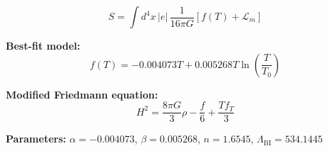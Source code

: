 
\begin{equation}
  S = \int d^4x \, |e| \, \frac{1}{16\pi G} \left[ f(T) + \mathcal{L}_m \right]
\end{equation}

\textbf{Best-fit model:}
\begin{equation}
  f(T) = -0.004073 T + 0.005268 T \ln\!\left(\frac{T}{T_0}\right)
\end{equation}

\textbf{Modified Friedmann equation:}
\begin{equation}
  H^2 = \frac{8\pi G}{3} \rho - \frac{f}{6} + \frac{T f_T}{3}
\end{equation}

\textbf{Parameters:}
$\alpha = -0.004073$, \quad
$\beta = 0.005268$, \quad
$n = 1.6545$, \quad
$\Lambda_{\text{BI}} = 534.1445$
